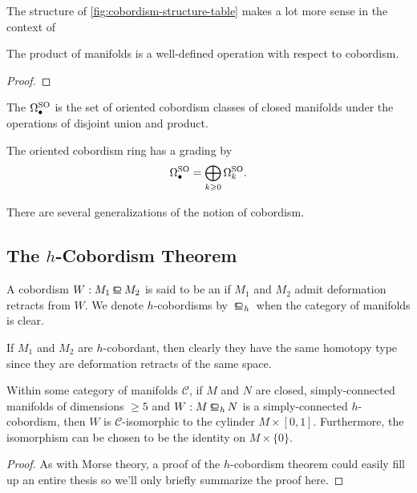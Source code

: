 The structure of \cref{fig:cobordism-structure-table} makes a lot more sense in the context of 

\begin{proposition}
	The product of manifolds is a well-defined operation with respect to cobordism.
\end{proposition}
\begin{proof}
\end{proof}

\begin{definition}
	The  $\Omega^{\operatorname{SO}}_\bullet$ is the set of oriented cobordism classes of closed manifolds under the operations of disjoint union and product.
\end{definition}

The oriented cobordism ring has a grading by
\[
	\Omega_\bullet^{\operatorname{SO}} = \bigoplus_{k\geqslant 0} \Omega^{\operatorname{SO}}_k.
\]



\begin{remark}
	There are several generalizations of the notion of cobordism.
\end{remark}


\subsection{The $h$-Cobordism Theorem}

\begin{definition}
	A cobordism $W : M_1\bord M_2$ is said to be an  if $M_1$ and $M_2$ admit deformation retracts from $W$. We denote $h$-cobordisms by $\hbord$ when the category of manifolds is clear.
\end{definition}

If $M_1$ and $M_2$ are $h$-cobordant, then clearly they have the same homotopy type since they are deformation retracts of the same space.

\begin{theorem}[$h$-cobordism]\label{thm:h-cobordism}
	Within some category of manifolds $\mathscr{C}$, if $M$ and $N$ are closed, simply-connected manifolds of dimensions $\geq 5$ and $W : M \hbord N$ is a simply-connected $h$-cobordism, then $W$ is $\mathscr{C}$-isomorphic to the cylinder $M\times [0,1]$. Furthermore, the isomorphism can be chosen to be the identity on $M\times \{0\}$.
\end{theorem}
\begin{proof}
	As with Morse theory, a proof of the $h$-cobordism theorem could easily fill up an entire thesis so we'll only briefly summarize the proof here.

\end{proof}

